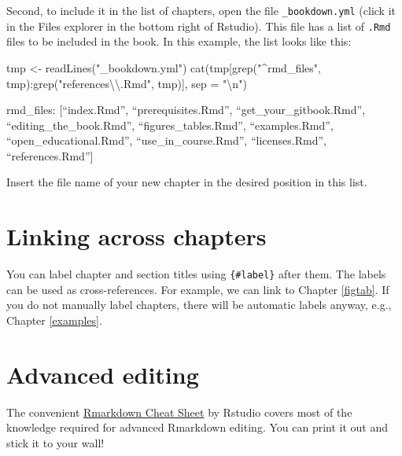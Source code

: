 \documentclass[
]{book}
\newenvironment{Shaded}{\begin{snugshade}}{\end{snugshade}}
\newcommand{\AttributeTok}[1]{\textcolor[rgb]{0.77,0.63,0.00}{#1}}
\newcommand{\FunctionTok}[1]{\textcolor[rgb]{0.00,0.00,0.00}{#1}}
\newcommand{\NormalTok}[1]{#1}
\newcommand{\OtherTok}[1]{\textcolor[rgb]{0.56,0.35,0.01}{#1}}
\newcommand{\SpecialCharTok}[1]{\textcolor[rgb]{0.00,0.00,0.00}{#1}}
\newcommand{\StringTok}[1]{\textcolor[rgb]{0.31,0.60,0.02}{#1}}
\begin{document}
Second, to include it in the list of chapters, open the file \texttt{\_bookdown.yml} (click it in the Files explorer in the bottom right of Rstudio). This file has a list of \texttt{.Rmd} files to be included in the book. In this example, the list looks like this:

\begin{Shaded}
\begin{Highlighting}[]
\NormalTok{tmp }\OtherTok{\textless{}{-}} \FunctionTok{readLines}\NormalTok{(}\StringTok{"\_bookdown.yml"}\NormalTok{)}
\FunctionTok{cat}\NormalTok{(tmp[}\FunctionTok{grep}\NormalTok{(}\StringTok{"\^{}rmd\_files"}\NormalTok{, tmp)}\SpecialCharTok{:}\FunctionTok{grep}\NormalTok{(}\StringTok{"references}\SpecialCharTok{\textbackslash{}\textbackslash{}}\StringTok{.Rmd"}\NormalTok{, tmp)], }\AttributeTok{sep =} \StringTok{"}\SpecialCharTok{\textbackslash{}n}\StringTok{"}\NormalTok{)}
\end{Highlighting}
\end{Shaded}

rmd\_files: {[}``index.Rmd'',
``prerequisites.Rmd'',
``get\_your\_gitbook.Rmd'',
``editing\_the\_book.Rmd'',
``figures\_tables.Rmd'',
``examples.Rmd'',
``open\_educational.Rmd'',
``use\_in\_course.Rmd'',
``licenses.Rmd'',
``references.Rmd''{]}

Insert the file name of your new chapter in the desired position in this list.

\hypertarget{linking-across-chapters}{%
\section{Linking across chapters}\label{linking-across-chapters}}

You can label chapter and section titles using \texttt{\{\#label\}} after them. The labels can be used as cross-references. For example, we can link to Chapter \ref{figtab}. If you do not manually label chapters, there will be automatic labels anyway, e.g., Chapter \ref{examples}.

\hypertarget{advanced-editing}{%
\section{Advanced editing}\label{advanced-editing}}

The convenient \href{https://rstudio.com/wp-content/uploads/2016/03/rmarkdown-cheatsheet-2.0.pdf}{Rmarkdown Cheat Sheet} by Rstudio covers most of the knowledge required for advanced Rmarkdown editing. You can print it out and stick it to your wall!
\end{document}
